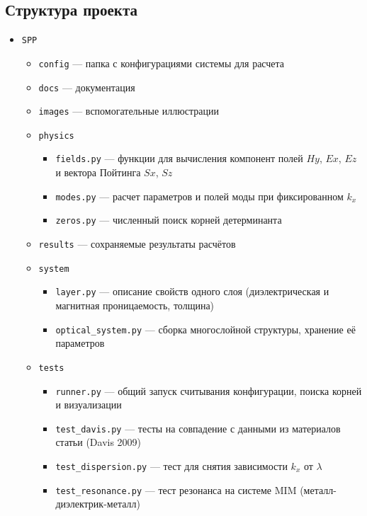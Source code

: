 \documentclass{article}
\begin{document}
\subsection{Структура проекта}

\begin{itemize}
  \item \texttt{SPP}
    \begin{itemize}
      \item \texttt{config} — папка с конфигурациями системы для расчета
      \item \texttt{docs} — документация
      \item \texttt{images} — вспомогательные иллюстрации
      \item \texttt{physics}
        \begin{itemize}
          \item \texttt{fields.py} — функции для вычисления компонент полей $Hy$, $Ex$, $Ez$ и вектора Пойтинга $Sx$, $Sz$
          \item \texttt{modes.py} — расчет параметров и полей моды при фиксированном $k_x$
          \item \texttt{zeros.py} — численный поиск корней детерминанта
        \end{itemize}
      \item \texttt{results} — сохраняемые результаты расчётов
      \item \texttt{system}
        \begin{itemize}
          \item \texttt{layer.py} — описание свойств одного слоя (диэлектрическая и магнитная проницаемость, толщина)
          \item \texttt{optical\_system.py} — сборка многослойной структуры, хранение её параметров
        \end{itemize}
      \item \texttt{tests}
        \begin{itemize}
          \item \texttt{runner.py} — общий запуск считывания конфигурации, поиска корней и визуализации
          \item \texttt{test\_davis.py} — тесты на совпадение с данными из материалов статьи (Davis 2009)
          \item \texttt{test\_dispersion.py} — тест для снятия зависимости $k_x$ от $\lambda$
          \item \texttt{test\_resonance.py} — тест резонанса на системе MIM (металл-диэлектрик-металл)
        \end{itemize}

\end{itemize}
\end{itemize}
\end{document}
